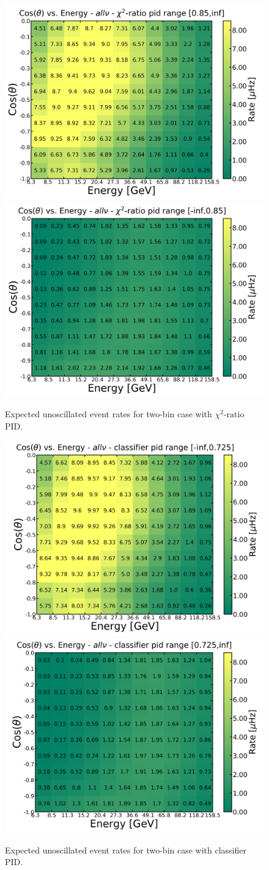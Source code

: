 \begin{appendices}
\begin{figure}[h]
    \centering
    \includegraphics[width=0.49\linewidth]{figures/santa_cut_085_allnu_1_unoscillated_vmax.png}
    \includegraphics[width=0.49\linewidth]{figures/santa_cut_085_allnu_0_unoscillated_vmax.png}
    \caption[Expected unoscillated event rates for two-bin case with $\chi^2\textrm{-ratio}$ PID]{Expected unoscillated event rates for two-bin case with $\chi^2\textrm{-ratio}$ PID.}
    \label{fig:unoscillated_histrograms_santa_2bin}
\end{figure}

\begin{figure}[h]
    \centering
    \includegraphics[width=0.49\linewidth]{figures/two_bin_cut_0725_allnu_0_unoscillated_vmax.png}
    \includegraphics[width=0.49\linewidth]{figures/two_bin_cut_0725_allnu_1_unoscillated_vmax.png}
    \caption[Expected unoscillated event rates for two-bin case with classifier PID]{Expected unoscillated event rates for two-bin case with classifier PID.}
    \label{fig:unoscillated_histrograms_classifier_2bin}
\end{figure}


\end{appendices}
